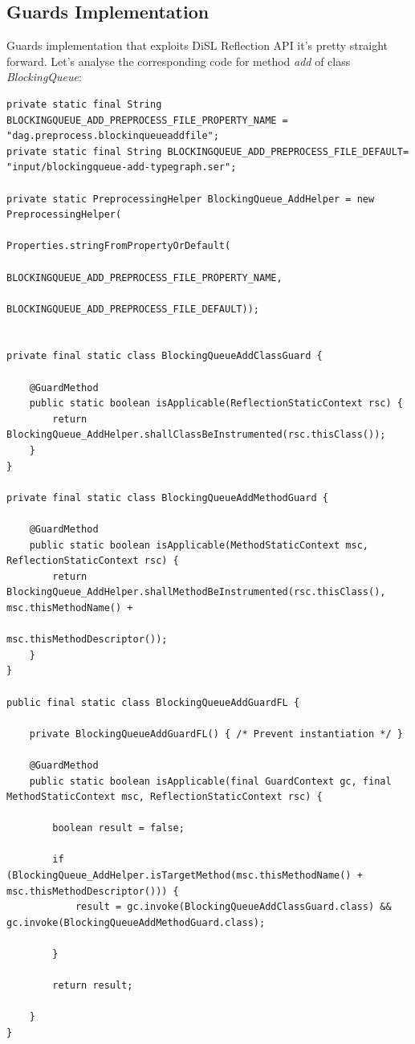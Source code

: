 \documentclass[]{usiinfthesis}
\begin{document}
\subsection{Guards Implementation}
Guards implementation that exploits DiSL Reflection API it's pretty straight forward. Let's analyse the corresponding code for method \textit{add} of class \textit{BlockingQueue}:

\vspace*{0.5cm}
\begin{verbatim}
private static final String BLOCKINGQUEUE_ADD_PREPROCESS_FILE_PROPERTY_NAME = "dag.preprocess.blockinqueueaddfile";
private static final String BLOCKINGQUEUE_ADD_PREPROCESS_FILE_DEFAULT= "input/blockingqueue-add-typegraph.ser";

private static PreprocessingHelper BlockingQueue_AddHelper = new PreprocessingHelper(
                                                            Properties.stringFromPropertyOrDefault(
                                                                    BLOCKINGQUEUE_ADD_PREPROCESS_FILE_PROPERTY_NAME,
                                                                    BLOCKINGQUEUE_ADD_PREPROCESS_FILE_DEFAULT));


private final static class BlockingQueueAddClassGuard {

    @GuardMethod
    public static boolean isApplicable(ReflectionStaticContext rsc) {
        return BlockingQueue_AddHelper.shallClassBeInstrumented(rsc.thisClass());
    }
}

private final static class BlockingQueueAddMethodGuard {

    @GuardMethod
    public static boolean isApplicable(MethodStaticContext msc, ReflectionStaticContext rsc) {
        return BlockingQueue_AddHelper.shallMethodBeInstrumented(rsc.thisClass(), msc.thisMethodName() +
                                                                      msc.thisMethodDescriptor());
    }
}

public final static class BlockingQueueAddGuardFL {

    private BlockingQueueAddGuardFL() { /* Prevent instantiation */ }

    @GuardMethod
    public static boolean isApplicable(final GuardContext gc, final MethodStaticContext msc, ReflectionStaticContext rsc) {

        boolean result = false;

        if (BlockingQueue_AddHelper.isTargetMethod(msc.thisMethodName() + msc.thisMethodDescriptor())) {
            result = gc.invoke(BlockingQueueAddClassGuard.class) && gc.invoke(BlockingQueueAddMethodGuard.class);

        }

        return result;

    }
}
\end{verbatim}
\vspace*{0.5cm}
 
\end{document}
